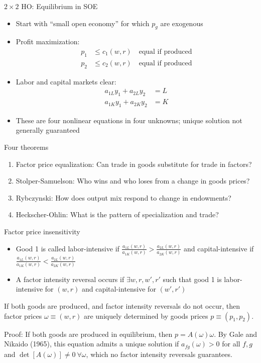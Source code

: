 \documentclass[10pt,notes=hide]{beamer}
\begin{document}
\begin{frame}{$2 \times 2$ HO: Equilibrium in SOE}
\begin{itemize}
	\item Start with ``small open economy'' for which $p_g$ are exogenous
	\item Profit maximization:
	\begin{align*}
	p_{1} &\leq c_{1}\left( w,r\right) \quad \text{equal if produced} \\
	p_{2} &\leq c_{2}\left( w,r\right) \quad \text{equal if produced} 
	\end{align*}
	\item Labor and capital markets clear:
	\begin{align*}
	a_{1L}y_{1}+a_{2L}y_{2} &=L \\
	a_{1K}y_{1}+a_{2K}y_{2} &=K
	\end{align*}
	\item These are four nonlinear equations in four unknowns; unique solution not generally guaranteed
\end{itemize}
\end{frame}
\begin{frame}{Four theorems}
\begin{enumerate}
	\item Factor price equalization: Can trade in goods substitute for trade in factors?
	\item Stolper-Samuelson: Who wins and who loses from a change in goods prices?
	\item Rybczynski: How does output mix respond to change in endowments?
	\item Heckscher-Ohlin: What is the pattern of specialization and trade?
\end{enumerate}
\end{frame}
\begin{frame}{Factor price insensitivity}
\begin{itemize}
\item 
Good 1 is called labor-intensive if 
$\frac{a_{1L}\left(w,r\right)}{a_{1K}\left(w,r\right)}
>\frac{a_{2L}\left(w,r\right)}{a_{2K}\left(w,r\right)}$
and capital-intensive if 
$\frac{a_{1L}\left(w,r\right)}{a_{1K}\left(w,r\right)}
<\frac{a_{2L}\left(w,r\right)}{a_{2K}\left(w,r\right)}$
\item
A factor intensity reversal occurs if $\exists w,r,w',r'$ such that good 1 is labor-intensive for $(w,r)$ and capital-intensive for $(w',r')$
\end{itemize}
\begin{lemma}
If both goods are produced, and factor intensity reversals do not occur,
then factor prices $\omega \equiv (w,r)$ are uniquely determined by goods prices $p \equiv (p_1,p_2)$.
\end{lemma}
Proof:
If both goods are produced in equilibrium, then $p = A(\omega) \omega$. By Gale and Nikaido (1965), this equation admits a unique solution if $a_{fg}(\omega)>0$ for all $f,g$ and $\det[A(\omega)]\neq 0\ \forall \omega$, which no factor intensity reversals guarantees.
\end{frame}
\end{document}
